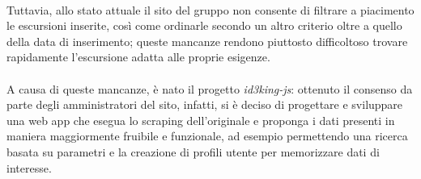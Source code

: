 \documentclass[11pt]{report}
\begin{document}
\\Tuttavia, allo stato attuale il sito del gruppo non consente di filtrare a piacimento le escursioni inserite, così come ordinarle secondo un altro criterio oltre a quello della data di inserimento; queste mancanze rendono piuttosto difficoltoso trovare rapidamente l'escursione adatta alle proprie esigenze.
\\\\A causa di queste mancanze, è nato il progetto \textit{id3king-js}: ottenuto il consenso da parte degli amministratori del sito, infatti, si è deciso di progettare e sviluppare una web app che esegua lo scraping dell'originale e proponga i dati presenti in maniera maggiormente fruibile e funzionale, ad esempio permettendo una ricerca basata su parametri e la creazione di profili utente per memorizzare dati di interesse.
\pagebreak
\end{document}
